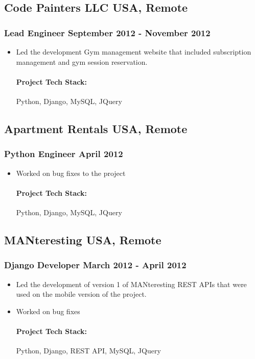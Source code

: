 \documentclass[11pt]{article} %
\begin{document}
\subsection{Code Painters LLC \hfill USA, Remote}
\subsubsection{Lead Engineer \hfill  September 2012 - November 2012}
\begin{itemize}
    \item Led the development Gym management website that included subscription management and gym session reservation.
    \paragraph{Project Tech Stack:} Python, Django, MySQL, JQuery
\end{itemize}

\subsection{Apartment Rentals \hfill USA, Remote}
\subsubsection{Python Engineer \hfill  April 2012}
\begin{itemize}
    \item Worked on bug fixes to the project
    \paragraph{Project Tech Stack:} Python, Django, MySQL, JQuery
\end{itemize}

\subsection{MANteresting \hfill USA, Remote}
\subsubsection{Django Developer \hfill  March 2012 - April 2012}
\begin{itemize}
    \item Led the development of version 1 of MANteresting REST APIs that were used on the mobile version of the project.
    \item Worked on bug fixes
    \paragraph{Project Tech Stack:} Python, Django, REST API, MySQL, JQuery
\end{itemize}
\end{document}
